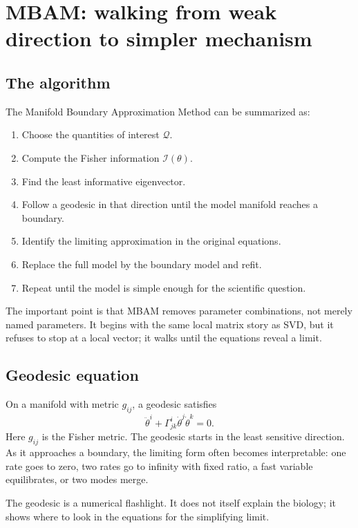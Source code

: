 \documentclass[a4paper]{article}
\newcommand{\param}{\theta}
\newcommand{\qoi}{\mathcal{Q}}
\newcommand{\fim}{\mathcal{I}}
\begin{document}
\section{MBAM: walking from weak direction to simpler mechanism}

\subsection{The algorithm}

The Manifold Boundary Approximation Method can be summarized as:
\begin{enumerate}[leftmargin=2em]
  \item Choose the quantities of interest \(\qoi\).
  \item Compute the Fisher information \(\fim(\param)\).
  \item Find the least informative eigenvector.
  \item Follow a geodesic in that direction until the model manifold reaches a boundary.
  \item Identify the limiting approximation in the original equations.
  \item Replace the full model by the boundary model and refit.
  \item Repeat until the model is simple enough for the scientific question.
\end{enumerate}

The important point is that MBAM removes parameter combinations, not merely named parameters.  It begins with the same local matrix story as SVD, but it refuses to stop at a local vector; it walks until the equations reveal a limit.

\subsection{Geodesic equation}

On a manifold with metric \(g_{ij}\), a geodesic satisfies
\[
  \ddot{\theta}^i+\Gamma^i_{jk}\dot{\theta}^j\dot{\theta}^k=0.
\]
Here \(g_{ij}\) is the Fisher metric.  The geodesic starts in the least sensitive direction.  As it approaches a boundary, the limiting form often becomes interpretable: one rate goes to zero, two rates go to infinity with fixed ratio, a fast variable equilibrates, or two modes merge.

\begin{remark}
  The geodesic is a numerical flashlight.  It does not itself explain the biology; it shows where to look in the equations for the simplifying limit.
\end{remark}
\end{document}
